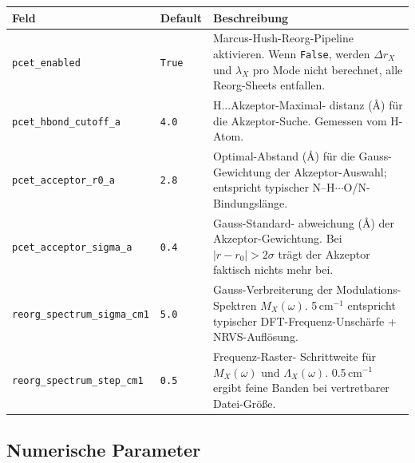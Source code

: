 \documentclass[11pt,a4paper,twoside]{article}
\theoremstyle{remark}
\begin{document}
\begin{longtable}{p{} p{} p{}}
\toprule
\textbf{Feld} & \textbf{Default} & \textbf{Beschreibung} \\
\midrule
\endhead
\texttt{pcet\_enabled} & \texttt{True} & Marcus-Hush-Reorg-Pipeline
  aktivieren. Wenn \texttt{False}, werden $\Delta r_X$ und $\lambda_X$
  pro Mode nicht berechnet, alle Reorg-Sheets entfallen. \\
\texttt{pcet\_hbond\_cutoff\_a} & \texttt{4.0} & H...Akzeptor-Maximal-
  distanz (\AA{}) f\"ur die Akzeptor-Suche. Gemessen vom H-Atom. \\
\texttt{pcet\_acceptor\_r0\_a} & \texttt{2.8} & Optimal-Abstand
  (\AA{}) f\"ur die Gauss-Gewichtung der Akzeptor-Auswahl;
  entspricht typischer N--H$\cdots$O/N-Bindungsl\"ange. \\
\texttt{pcet\_acceptor\_sigma\_a} & \texttt{0.4} & Gauss-Standard-
  abweichung (\AA{}) der Akzeptor-Gewichtung. Bei
  $|r - r_0| > 2\sigma$ tr\"agt der Akzeptor faktisch nichts mehr bei. \\
\texttt{reorg\_spectrum\_sigma\_cm1} & \texttt{5.0} & Gauss-Verbreiterung
  der Modulations-Spektren $M_X(\omega)$. 5\,cm$^{-1}$ entspricht
  typischer DFT-Frequenz-Unsch\"arfe + NRVS-Aufl\"osung. \\
\texttt{reorg\_spectrum\_step\_cm1} & \texttt{0.5} & Frequenz-Raster-
  Schrittweite f\"ur $M_X(\omega)$ und $\Lambda_X(\omega)$. 0.5\,cm$^{-1}$
  ergibt feine Banden bei vertretbarer Datei-Gr\"o{\ss}e. \\
\bottomrule
\end{longtable}

\subsection{Numerische Parameter}
\end{document}
